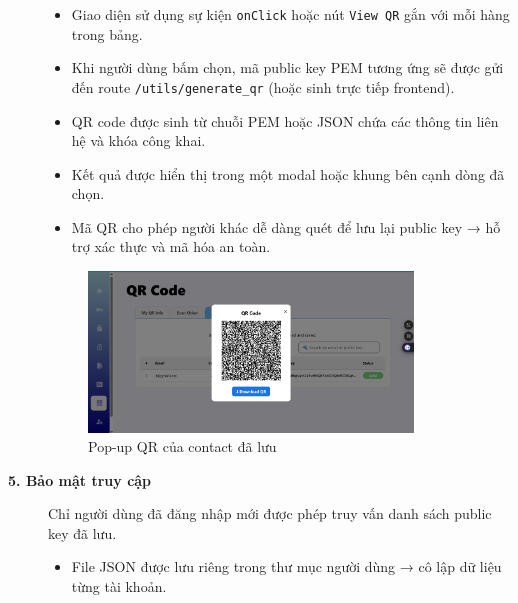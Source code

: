 \begin{description}
    \begin{itemize}
        \item Giao diện sử dụng sự kiện \texttt{onClick} hoặc nút \texttt{View QR} gắn với mỗi hàng trong bảng.
        \item Khi người dùng bấm chọn, mã public key PEM tương ứng sẽ được gửi đến route \texttt{/utils/generate\_qr} (hoặc sinh trực tiếp frontend).
        \item QR code được sinh từ chuỗi PEM hoặc JSON chứa các thông tin liên hệ và khóa công khai.
        \item Kết quả được hiển thị trong một modal hoặc khung bên cạnh dòng đã chọn.
        \item Mã QR cho phép người khác dễ dàng quét để lưu lại public key → hỗ trợ xác thực và mã hóa an toàn.
    \end{itemize}

    \begin{figure}[H]
        \centering
        \includegraphics[width=0.85\textwidth]{img/14_pubkey/14_pubkey_qr.png}
        \caption{Pop-up QR của contact đã lưu}
    \end{figure}

    \item[\textbf{5. Bảo mật truy cập}]
    Chỉ người dùng đã đăng nhập mới được phép truy vấn danh sách public key đã lưu.
    \begin{itemize}
        \item File JSON được lưu riêng trong thư mục người dùng → cô lập dữ liệu từng tài khoản.
    \end{itemize}

\end{description}
